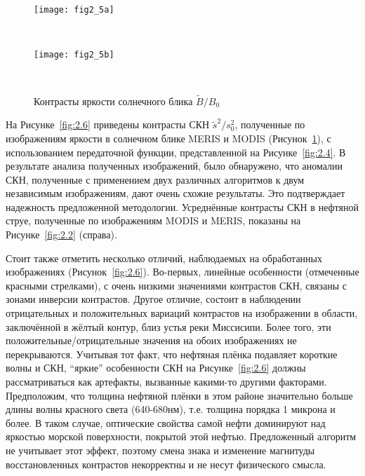 \begin{figure}[H]
   	\centering
	\begin{minipage}{.97\textwidth}
	    \subcaptionbox{\label{fig:2.5a}}
		{\texttt{[image: fig2\_5a]}}
	\end{minipage}
	\hfill
	\\
	\begin{minipage}{.97\textwidth}
	    \subcaptionbox{\label{fig:2.5b}}
		{\texttt{[image: fig2\_5b]}}
	\end{minipage}
    \\
    \caption{Контрасты яркости солнечного блика $\tilde{B}/B_{0}$}
    \label{fig:2.5}
\end{figure}


На Рисунке~\ref{fig:2.6} приведены контрасты СКН $\tilde{s}^{2} /s_{0}^{2}$, полученные по изображениям яркости в солнечном блике MERIS и MODIS (Рисунок~\ref{fig:2.5}), с использованием передаточной функции, представленной на Рисунке~\ref{fig:2.4}. В результате анализа полученных изображений, было обнаружено, что аномалии СКН, полученные с применением двух различных алгоритмов к двум независимым изображениям, дают очень схожие результаты. Это подтверждает надежность предложенной методологии. Усреднённые контрасты СКН в нефтяной струе, полученные по изображениям MODIS и MERIS, показаны на Рисунке~\ref{fig:2.2} (справа).

Стоит также отметить несколько отличий, наблюдаемых на обработанных изображениях (Рисунок~\ref{fig:2.6}). Во-первых, линейные особенности (отмеченные красными стрелками), с очень низкими значениями контрастов СКН, связаны с зонами инверсии контрастов. Другое отличие, состоит в наблюдении отрицательных и положительных вариаций контрастов на изображении в области, заключённой в жёлтый контур, близ устья реки Миссисипи. Более того, эти положительные/отрицательные значения на обоих изображениях не перекрываются. Учитывая тот факт, что нефтяная плёнка подавляет короткие волны и СКН, ``яркие'' особенности СКН на Рисунке~\ref{fig:2.6} должны рассматриваться как артефакты, вызванные какими-то другими факторами. Предположим, что толщина нефтяной плёнки в этом районе значительно больше длины волны красного света (640-680нм), т.е. толщина порядка 1 микрона и более. В таком случае, оптические свойства самой нефти доминируют над яркостью морской поверхности, покрытой этой нефтью. Предложенный алгоритм не учитывает этот эффект, поэтому смена знака и изменение магнитуды восстановленных контрастов некорректны и не несут физического смысла.


